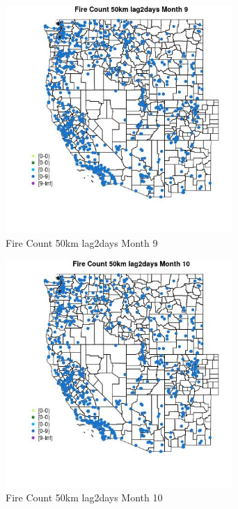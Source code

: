 \begin{figure} 
\centering  
\includegraphics[width=0.77\textwidth]{Code_Outputs/Report_ML_input_PM25_Step4_part_e_de_duplicated_aves_compiled_2019-05-21wNAs_MapObsMo9Fire_Count_50km_lag2days.jpg} 
\caption{\label{fig:Report_ML_input_PM25_Step4_part_e_de_duplicated_aves_compiled_2019-05-21wNAsMapObsMo9Fire_Count_50km_lag2days}Fire Count 50km lag2days Month 9} 
\end{figure} 
 

\clearpage 

\begin{figure} 
\centering  
\includegraphics[width=0.77\textwidth]{Code_Outputs/Report_ML_input_PM25_Step4_part_e_de_duplicated_aves_compiled_2019-05-21wNAs_MapObsMo10Fire_Count_50km_lag2days.jpg} 
\caption{\label{fig:Report_ML_input_PM25_Step4_part_e_de_duplicated_aves_compiled_2019-05-21wNAsMapObsMo10Fire_Count_50km_lag2days}Fire Count 50km lag2days Month 10} 
\end{figure} 
 

